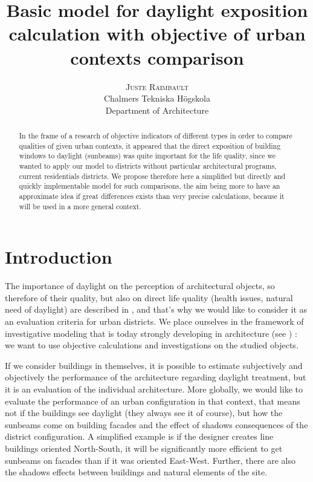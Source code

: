 \documentclass[english]{article}
\newcommand{\noun}[1]{\textsc{#1}}
\begin{document}
\title{Basic model for daylight exposition calculation with objective of
urban contexts comparison}


\author{\noun{Juste Raimbault}\\
Chalmers Tekniska Högskola\\
Department of Architecture}
\maketitle
\begin{abstract}
In the frame of a research of objective indicators of different types
in order to compare qualities of given urban contexts, it appeared
that the direct exposition of building windows to daylight (sunbeams)
was quite important for the life quality, since we wanted to apply
our model to districts without particular architectural programs,
current residentials districts. We propose therefore here a simplified
but directly and quickly implementable model for such comparisons,
the aim being more to have an approximate idea if great differences
exists than very precise calculations, because it will be used in
a more general context.
\end{abstract}

\section*{Introduction}

The importance of daylight on the perception of architectural objects,
so therefore of their quality, but also on direct life quality (health
issues, natural need of daylight) are described in \cite{phillips19232004},
and that's why we would like to consider it as an evaluation criteria
for urban districts. We place ourselves in the framework of investigative
modeling that is today strongly developing in architecture (see \cite{ArchMorph})
: we want to use objective calculations and investigations on the
studied objects.

If we consider buildings in themselves, it is possible to estimate
subjectively and objectively the performance of the architecture regarding
daylight treatment, but it is an evaluation of the individual architecture.
More globally, we would like to evaluate the performance of an urban
configuration in that context, that means not if the buildings see
daylight (they always see it of course), but how the sunbeams come
on building facades and the effect of shadows consequences of the
district configuration. A simplified example is if the designer creates
line buildings oriented North-South, it will be significantly more
efficient to get sunbeams on facades than if it was oriented East-West.
Further, there are also the shadows effects between buildings and
natural elements of the site.
\end{document}
